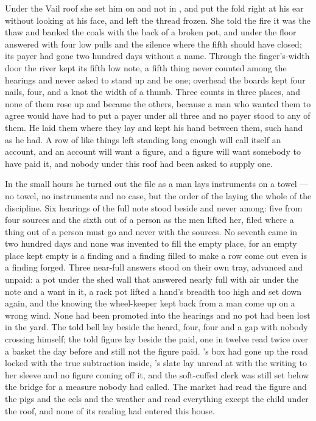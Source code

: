 Under the Vail roof she set him on  and not in , and put the fold right at his ear without looking at his face, and left the thread frozen. She told the fire it was the thaw and banked the coals with the back of a broken pot, and under the floor  answered with four low pulls and the silence where the fifth should have closed; its payer had gone two hundred days without a name. Through the finger's-width door the river kept its fifth low note, a fifth thing never counted among the hearings and never asked to stand up and be one; overhead the boards kept four nails, four, and a knot the width of a thumb. Three counts in three places, and none of them rose up and became the others, because a man who wanted them to agree would have had to put a payer under all three and no payer stood to any of them. He laid them where they lay and kept his hand between them, such hand as he had. A row of like things left standing long enough will call itself an account, and an account will want a figure, and a figure will want somebody to have paid it, and nobody under this roof had been asked to supply one.

\scenebreak

In the small hours he turned out the file as a man lays instruments on a towel --- no towel, no instruments and no case, but the order of the laying the whole of the discipline. Six hearings of the full note stood beside and never among: five from four sources and the sixth out of a person as the men lifted her, filed where a thing out of a person must go and never with the sources. No seventh came in two hundred days and none was invented to fill the empty place, for an empty place kept empty is a finding and a finding filled to make a row come out even is a finding forged. Three near-full answers stood on their own tray, advanced and unpaid: a pot under the shed wall that answered nearly full with air under the note and a want in it, a rack pot lifted a hand's breadth too high and set down again, and the knowing the wheel-keeper kept back from a man come up on a wrong wind. None had been promoted into the hearings and no pot had been lost in the yard. The told bell lay beside the heard, four, four and a gap with nobody crossing himself; the told figure lay beside the paid, one in twelve read twice over a basket the day before and still not the figure paid. 's box had gone up the road locked with the true subtraction inside, 's slate lay unread at  with the writing to her sleeve and no figure coming off it, and the soft-cuffed clerk was still set below the bridge for a measure nobody had called. The market had read the figure and the pigs and the eels and the weather and read everything except the child under the roof, and none of its reading had entered this house.

